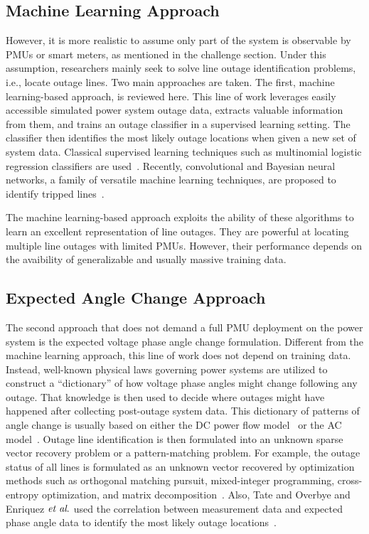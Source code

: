 \subsection{Machine Learning Approach}
However, it is more realistic to assume only part of the system is observable by PMUs or smart meters, as mentioned in the challenge section. Under this assumption, researchers mainly seek to solve line outage identification problems, i.e., locate outage lines. Two main approaches are taken. The first, machine learning-based approach, is reviewed here. This line of work leverages easily accessible simulated power system outage data, extracts valuable information from them, and trains an outage classifier in a supervised learning setting. The classifier then identifies the most likely outage locations when given a new set of system data. Classical supervised learning techniques such as multinomial logistic regression classifiers are used~\cite{Garcia2016,Kim2018}. Recently, convolutional and Bayesian neural networks, a family of versatile machine learning techniques, are proposed to identify tripped lines~\cite{Li2019a,Zhao2020}. 

The machine learning-based approach exploits the ability of these algorithms to learn an excellent representation of line outages. They are powerful at locating multiple line outages with limited PMUs. However, their performance depends on the avaibility of generalizable and usually massive training data.

\subsection{Expected Angle Change Approach}
The second approach that does not demand a full PMU deployment on the power system is the expected voltage phase angle change formulation. Different from the machine learning approach, this line of work does not depend on training data. Instead, well-known physical laws governing power systems are utilized to construct a ``dictionary'' of how voltage phase angles might change following any outage. That knowledge is then used to decide where outages might have happened after collecting post-outage system data. This dictionary of patterns of angle change is usually based on either the DC power flow model~\cite{Tate2008,tate2009double,Zhu2012,Emami2013,Chen2014,Wu2015} or the AC model~\cite{Costilla-Enriquez2019}. Outage line identification is then formulated into an unknown sparse vector recovery problem or a pattern-matching problem. 
For example, the outage status of all lines is formulated as an unknown vector recovered by optimization methods such as orthogonal matching pursuit, mixed-integer programming, cross-entropy optimization, and matrix decomposition~\cite{Zhu2012, Emami2013,Chen2014,Wu2015}. Also, Tate and Overbye and Enriquez $\textit{et al}.$ used the correlation between measurement data and expected phase angle data to identify the most likely outage locations~\cite{Tate2008,Costilla-Enriquez2019}. 

